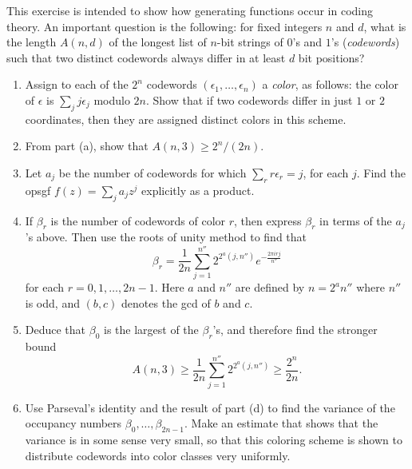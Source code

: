 \begin{exercise} \label{ex:2-25}
    This exercise is intended to show how generating functions occur in coding theory. An important question is the following: for fixed integers $n$ and $d$, what is the length $A(n,d)$ of the longest list of $n$-bit strings of $0$'s and $1$'s (\emph{codewords}) such that two distinct codewords always differ in at least $d$ bit positions?
    \begin{enumerate}[label=(\alph*)]
        \item Assign to each of the $2^n$ codewords $(\epsilon_1,\ldots,\epsilon_n)$ a \emph{color}, as follows: the color of $\epsilon$ is $\sum_j j \epsilon_j$ modulo $2n$. Show that if two codewords differ in just $1$ or $2$ coordinates, then they are assigned distinct colors in this scheme.
        \item From part (a), show that $A(n,3) \geq 2^n /(2n)$.
        \item Let $a_j$ be the number of codewords for which $\sum_r r\epsilon_r = j$, for each $j$. Find the opsgf $f(z) = \sum_j a_jz^j$ explicitly as a product.
        \item If $\beta_r$ is the number of codewords of color $r$, then express $\beta_r$ in terms of the $a_j$'s above. Then use the roots of unity method to find that 
        \[
            \beta_r = \frac{1}{2n}\sum_{j=1}^{n''} 2^{2^a(j,n'')}e^{-\frac{2\pi irj}{n''}}
        \]
        for each $r = 0,1,\ldots,2n-1$. Here $a$ and $n''$ are defined by $n=2^an''$ where $n''$ is odd, and $(b,c)$ denotes the gcd of $b$ and $c$.
        \item Deduce that $\beta_0$ is the largest of the $\beta_r$'s, and therefore find the stronger bound
        \[
            A(n,3) \geq \frac{1}{2n} \sum_{j=1}^{n''}2^{2^a(j,n'')} \geq \frac{2^n}{2n}.
        \]
        \item Use Parseval's identity and the result of part (d) to find the variance of the occupancy numbers $\beta_0,\ldots,\beta_{2n-1}$. Make an estimate that shows that the variance is in some sense very small, so that this coloring scheme is shown to distribute codewords into color classes very uniformly.
    \end{enumerate}
\end{exercise}
